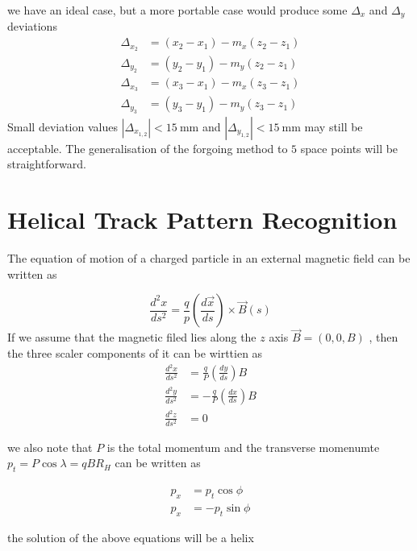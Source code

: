 we have an ideal case, but a more portable case would produce 
some $\Delta_{x}$ and $\Delta_{y}$ deviations
\begin{equation}
\begin{split}
\Delta_{x_2} &=(x_{2}-x_{1})- m_{x}(z_{2}-z_{1})\\
\Delta_{y_2} &=(y_{2}-y_{1})-m_{y}(z_{2}-z_{1})\\
\Delta_{x_3} &=(x_{3}-x_{1})-m_{x}(z_{3}-z_{1})\\
\Delta_{y_3} &=(y_{3}-y_{1})- m_{y}(z_{3}-z_{1})
\end{split}
\end{equation}
Small deviation values $|\Delta_{x_{1,2}}|<15 ~\text{mm}$ 
 and $|\Delta_{y_{1,2}}|<15 ~\text{mm}$  may still be acceptable.
The generalisation of the forgoing method to $5$
space points will be straightforward. 

\section{Helical Track Pattern Recognition \label{appendix4}}
The equation of motion of a charged particle in an external magnetic field
can be written as

\begin{equation}
\frac{d^2 x}{ds^2}=\frac{q}{p}(\frac{d \vec{x}}{ds})\times \vec{B}(s)
\end{equation}
If we assume that the magnetic filed lies along the $z$ axis $\vec{B}=(0,0,B)$
, then the three scaler components of it can be wirttien as
\begin{equation}
\begin{split}
\frac{d^2 x}{ds^2} &=\frac{q}{P}(\frac{dy}{ds})B\\
\frac{d^2 y}{ds^2} &=-\frac{q}{P}(\frac{dx}{ds})B\\
\frac{d^2 z}{ds^2} &=0
\end{split}
\end{equation}

we also note that $P$ is the total momentum and the transverse
momenumte $p_t =P \cos \lambda=qBR_H$
can be written as

\begin{equation}
\begin{split}
p_x &=p_t \cos \phi\\
p_x &=-p_t \sin \phi
\end{split}
\end{equation}

the solution of the above equations will be a helix


